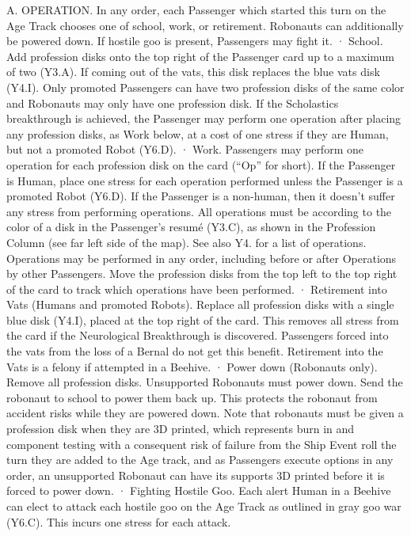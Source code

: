 \documentclass[a4paper]{book}
\begin{document}
A. OPERATION. In any order, each Passenger which started this turn on the Age Track chooses one of school, work, or retirement. Robonauts can additionally be powered down. If hostile goo is present, Passengers may fight it.
·       School. Add profession disks onto the top right of the Passenger card up to a maximum of two (Y3.A). If coming out of the vats, this disk replaces the blue vats disk (Y4.I). Only promoted Passengers can have two profession disks of the same color and Robonauts may only have one profession disk. If the Scholastics breakthrough is achieved, the Passenger may perform one operation after placing any profession disks, as Work below, at a cost of one stress if they are Human, but not a promoted Robot (Y6.D).
·       Work. Passengers may perform one operation for each profession disk on the card (“Op” for short). If the Passenger is Human, place one stress for each operation performed unless the Passenger is a promoted Robot (Y6.D). If the Passenger is a non-human, then it doesn’t suffer any stress from performing operations. All operations must be according to the color of a disk in the Passenger’s resumé (Y3.C), as shown in the Profession Column (see far left side of the map). See also Y4. for a list of operations. Operations may be performed in any order, including before or after Operations by other Passengers. Move the profession disks from the top left to the top right of the card to track which operations have been performed.
·       Retirement into Vats (Humans and promoted Robots). Replace all profession disks with a single blue disk (Y4.I), placed at the top right of the card. This removes all stress from the card if the Neurological Breakthrough is discovered. Passengers forced into the vats from the loss of a Bernal do not get this benefit. Retirement into the Vats is a felony if attempted in a Beehive.
·       Power down (Robonauts only). Remove all profession disks. Unsupported Robonauts must power down. Send the robonaut to school to power them back up. This protects the robonaut from accident risks while they are powered down. Note that robonauts must be given a profession disk when they are 3D printed, which represents burn in and component testing with a consequent risk of failure from the Ship Event roll the turn they are added to the Age track, and as Passengers execute options in any order, an unsupported Robonaut can have its supports 3D printed before it is forced to power down.
·       Fighting Hostile Goo. Each alert Human in a Beehive can elect to attack each hostile goo on the Age Track as outlined in gray goo war (Y6.C). This incurs one stress for each attack.
\end{document}

